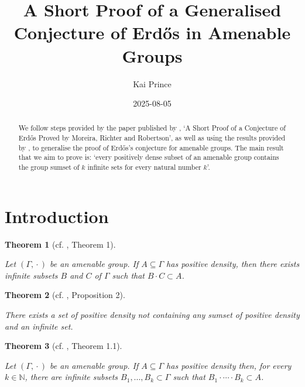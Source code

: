 \documentclass[
  british,
]{article}
\title{A Short Proof of a Generalised Conjecture of Erdős in Amenable
Groups}
\author{Kai Prince}
\date{2025-08-05}
\renewcommand*\contentsname{Table of contents}
\newcommand\contentsname{Table of contents}
\theoremstyle{plain}
\theoremstyle{definition}
\theoremstyle{plain}
\newtheorem{theorem}{Theorem}[section]
\theoremstyle{remark}
\newcommand{\AmenableGroup}{{\Gamma}}
\newcommand{\GroupOperation}[2]{{#1}\cdot{#2}}
\begin{document}
\maketitle
\begin{abstract}
We follow steps provided by the paper published by
, `A Short Proof of a
Conjecture of Erdős Proved by Moreira, Richter and Robertson', as well
as using the results provided by , to generalise the proof of Erdős's conjecture for amenable
groups. The main result that we aim to prove is: `every positively dense
subset of an amenable group contains the group sumset of \(k\) infinite
sets for every natural number \(k\)'.
\end{abstract}

\renewcommand*\contentsname{Table of contents}
{
\hypersetup{linkcolor=}
\setcounter{tocdepth}{3}
\tableofcontents
}

\section{Introduction}\label{introduction}

\begin{theorem}[cf. , Theorem
1]\protect\hypertarget{thm-GenErdosConjComb}{}\label{thm-GenErdosConjComb}

Let \((\AmenableGroup,\GroupOperation{}{})\) be an amenable group. If
\(A\subseteq\AmenableGroup\) has positive density, then there exists
infinite subsets \(B\) and \(C\) of \(\AmenableGroup\) such that
\(\GroupOperation{B}{C}\subset A\).

\end{theorem}

\begin{theorem}[cf. ,
Proposition
2]\protect\hypertarget{thm-GenErdosConjRel}{}\label{thm-GenErdosConjRel}

There exists a set of positive density not containing any sumset of
positive density and an infinite set.

\end{theorem}

\begin{theorem}[cf. ,
Theorem
1.1]\protect\hypertarget{thm-GenNErdosConjComb}{}\label{thm-GenNErdosConjComb}

Let \((\AmenableGroup,\GroupOperation{}{})\) be an amenable group. If
\(A\subseteq\AmenableGroup\) has positive density then, for every
\(k\in\mathbb{N}\), there are infinite subsets
\(B_1,...,B_k\subset\AmenableGroup\) such that
\(B_1\cdot\cdots\cdot B_k\subset A\).

\end{theorem}
\end{document}
